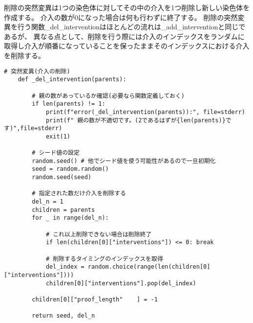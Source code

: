 削除の突然変異は1つの染色体に対してその中の介入を1つ削除し新しい染色体を作成する。
介入の数が0になった場合は何も行わずに終了する。
削除の突然変異を行う関数\_del\_interventionはほとんどの流れは\_add\_interventionと同じであるが、
異なる点として、削除を行う際には介入のインデックスをランダムに取得し介入が順番になっていることを保ったままそのインデックスにおける介入を削除する。
\begin{lstlisting}[caption=削除の突然変異を行う関数\_del\_intervention]
    # 突然変異(介入の削除)
    def _del_intervention(parents):

        # 親の数があっているか確認(必要なら関数定義しておく)
        if len(parents) != 1:
            print(f"error(_del_intervention(parents)):", file=stderr)
            print(f" 親の数が不適切です。(2であるはずが{len(parents)}です)",file=stderr)
            exit(1)

        # シード値の設定
        random.seed() # 他でシード値を使う可能性があるので一旦初期化
        seed = random.random()
        random.seed(seed)        

        # 指定された数だけ介入を削除する
        del_n = 1
        children = parents
        for _ in range(del_n):

            # これ以上削除できない場合は削除終了
            if len(children[0]["interventions"]) <= 0: break

            # 削除するタイミングのインデックスを取得
            del_index = random.choice(range(len(children[0]["interventions"])))
            children[0]["interventions"].pop(del_index)

        children[0]["proof_length"    ] = -1

        return seed, del_n
\end{lstlisting}

